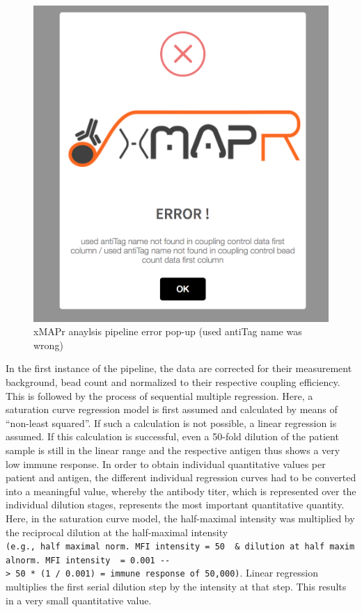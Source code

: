 \documentclass[
]{book}
\begin{document}
\begin{figure}

{\centering \includegraphics[width=15.92in]{figures/pipeline_error} 

}

\caption{xMAPr anaylsis pipeline error pop-up (used antiTag name was wrong) }\label{fig:pipelineError}
\end{figure}

In the first instance of the pipeline, the data are corrected for their measurement background, bead count and normalized to their respective coupling efficiency. This is followed by the process of sequential multiple regression. Here, a saturation curve regression model is first assumed and calculated by means of ``non-least squared''. If such a calculation is not possible, a linear regression is assumed. If this calculation is successful, even a 50-fold dilution of the patient sample is still in the linear range and the respective antigen thus shows a very low immune response. In order to obtain individual quantitative values per patient and antigen, the different individual regression curves had to be converted into a meaningful value, whereby the antibody titer, which is represented over the individual dilution stages, represents the most important quantitative quantity. Here, in the saturation curve model, the half-maximal intensity was multiplied by the reciprocal dilution at the half-maximal intensity \texttt{(e.g.,\ half\ maximal\ norm.\ MFI\ intensity\ =\ 50\ \ \&\ dilution\ at\ half\ maximalnorm.\ MFI\ intensity\ \ =\ 0.001\ -\/-\textgreater{}\ 50\ *\ (1\ /\ 0.001)\ =\ immune\ response\ of\ 50,000)}. Linear regression multiplies the first serial dilution step by the intensity at that step. This results in a very small quantitative value.
\end{document}
